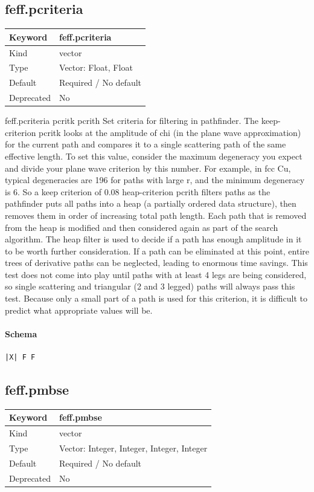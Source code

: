 \documentclass[11pt]{article}
\begin{document}
{{{{\subsection{feff.pcriteria}
\label{kw:feff-pcriteria}
\begin{longtable}{|p{1.5in}|p{4.5in}|}
\hline
Keyword & feff.pcriteria \\
\hline
Kind & vector \\
\hline
Type & Vector: Float, Float \\
\hline
Default & Required / No default \\
\hline
Deprecated & No \\
\hline
\end{longtable}
 feff.pcriteria{ pcritk pcrith }
 Set criteria for filtering in pathfinder. The keep-criterion pcritk looks at
 the amplitude of chi (in the plane wave approximation) for the current path
 and compares it to a single scattering path of the same effective length.
 To set this value, consider the maximum degeneracy you expect and divide
 your plane wave criterion by this number. For example, in fcc Cu, typical
 degeneracies are 196 for paths with large r, and the minimum degeneracy is 6.
 So a keep criterion of 0.08%
 heap-criterion pcrith filters paths as the pathfinder puts all paths into a
 heap (a partially ordered data structure), then removes them in order of
 increasing total path length. Each path that is removed from the heap is
 modified and then considered again as part of the search algorithm. The heap
 filter is used to decide if a path has enough amplitude in it to be worth
 further consideration. If a path can be eliminated at this point, entire
 trees of derivative paths can be neglected, leading to enormous time savings.
 This test does not come into play until paths with at least 4 legs are being
 considered, so single scattering and triangular (2 and 3 legged) paths will
 always pass this test. Because only a small part of a path is used for
 this criterion, it is difficult to predict what appropriate values will be.

\paragraph{Schema}
\begin{Verbatim}
|X| F F
\end{Verbatim}

\subsection{feff.pmbse}
\label{kw:feff-pmbse}
\begin{longtable}{|p{1.5in}|p{4.5in}|}
\hline
Keyword & feff.pmbse \\
\hline
Kind & vector \\
\hline
Type & Vector: Integer, Integer, Integer, Integer \\
\hline
Default & Required / No default \\
\hline
Deprecated & No \\
\hline
\end{longtable}
}}}}
\end{document}
